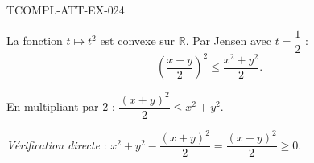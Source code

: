 \begin{corrige}{TCOMPL-ATT-EX-024}

La fonction $t \mapsto t^2$ est convexe sur $\mathbb{R}$. Par Jensen avec $t = \dfrac{1}{2}$ :
\[ \left(\frac{x+y}{2}\right)^2 \leq \frac{x^2 + y^2}{2}. \]


En multipliant par $2$ : $\dfrac{(x+y)^2}{2} \leq x^2 + y^2$.

\emph{Vérification directe} : $x^2 + y^2 - \dfrac{(x+y)^2}{2} = \dfrac{(x-y)^2}{2} \geq 0$.

\end{corrige}
